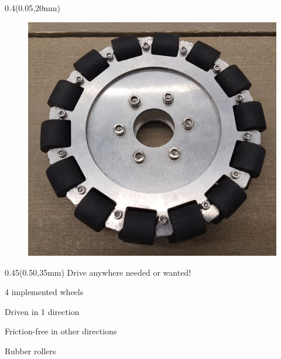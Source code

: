 \documentclass[aspectratio=43]{beamer}
\newcommand{\TULeftMargin}{0.05\paperwidth}
\newcommand{\TULeftWidth}{0.4\paperwidth}
\newcommand{\TURightMargin}{0.50\paperwidth}
\newcommand{\TURightWidth}{0.45\paperwidth}
\begin{document}
\begin{frame}
	\end{frame}	

	\begin{frame}
	
		\begin{textblock*}{\TULeftWidth}(\TULeftMargin,20mm)
			\begin{figure}
				\centering
				\includegraphics[width=1\linewidth]{../[TechUnitedStyle]/Figures/Omniwielen}
			\end{figure}
		\end{textblock*}
		
		\begin{textblock*}{\TURightWidth}(\TURightMargin,35mm)
			 Drive anywhere needed or wanted!
			\begin{TechUnitedItems}
				\item 4 implemented wheels
				\item Driven in 1 direction
				\item Friction-free in other directions
				\item Rubber rollers	
			
			\end{TechUnitedItems}
			
	\end{textblock*}
	
	\end{frame}
	
\end{document}
